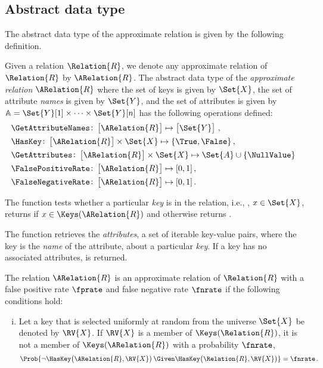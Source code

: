 \documentclass[ ../main.tex]{subfiles}
\begin{document}
\subsection{Abstract data type}
The abstract data type of the approximate relation is given by the following definition.
\begin{definition}
\label{def:approx_rel}
Given a relation $\Relation{R}$, we denote any approximate relation of $\Relation{R}$ by $\ARelation{R}$. The abstract data type of the \emph{approximate relation} $\ARelation{R}$ where the set of keys is given by $\Set{X}$, the set of attribute \emph{names} is given by $\Set{Y}$, and the set of attributes is given by $\mathbb{A} = \Set{Y}[1] \times \cdots \times \Set{Y}[n]$ has the following operations defined:
\begin{align*}
    &\GetAttributeNames \colon \left[\ARelation{R}\right] \mapsto \left[\Set{Y}\right]\,,\\
    &\HasKey \colon \left[\ARelation{R}\right] \times \Set{X} \mapsto \{ \True, \False \}\,,\\
    &\GetAttributes \colon \left[\ARelation{R}\right] \times \Set{X} \mapsto \Set{A} \cup \{ \NullValue \}\,\,\\
    &\FalsePositiveRate \colon \left[\ARelation{R}\right] \mapsto [0,1]\,,\\
    &\FalseNegativeRate \colon \left[\ARelation{R}\right] \mapsto [0,1]\,.
\end{align*}

The \HasKey function tests whether a particular \emph{key} is in the relation, i.e., , $x \in \Set{X}$, returns \True if $x \in \Keys(\ARelation{R})$ and otherwise returns \False.

The \GetAttributes function retrieves the \emph{attributes}, a set of iterable key-value pairs, where the key is the \emph{name} of the attribute, about a particular \emph{key}. If a key has no associated attributes, \NullValue is returned.

The relation $\ARelation{R}$ is an approximate relation of $\Relation{R}$ with a false positive rate $\fprate$ and false negative rate $\fnrate$ if the following conditions hold:
\begin{enumerate}[(i)]
    \item Let a key that is selected uniformly at random from the universe $\Set{X}$ be denoted by $\RV{X}$. If $\RV{X}$ is a member of $\Keys(\Relation{R})$, it is not a member of $\Keys(\ARelation{R})$ with a probability $\fnrate$,
    \begin{equation}
        \Prob{\neg \HasKey\!\left(\ARelation{R},\RV{X}\right) \Given \HasKey\!\left(\Relation{R},\RV{X}\right)} = \fnrate\,.
    \end{equation}
    

\end{enumerate}
\end{definition}
\end{document}
